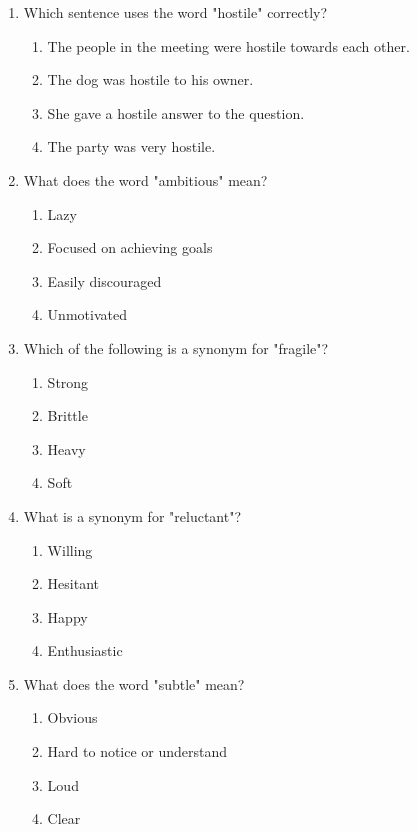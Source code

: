 \documentclass[12pt]{article}
\begin{document}
\begin{enumerate}
\item Which sentence uses the word "hostile" correctly?
\begin{enumerate}[label=\Alph*.]
    \item The people in the meeting were hostile towards each other.
    \item The dog was hostile to his owner.
    \item She gave a hostile answer to the question.
    \item The party was very hostile.
\end{enumerate}

\vspace{0.5cm}

\item What does the word "ambitious" mean?
\begin{enumerate}[label=\Alph*.]
    \item Lazy
    \item Focused on achieving goals
    \item Easily discouraged
    \item Unmotivated
\end{enumerate}

\vspace{0.5cm}

\item Which of the following is a synonym for "fragile"?
\begin{enumerate}[label=\Alph*.]
    \item Strong
    \item Brittle
    \item Heavy
    \item Soft
\end{enumerate}

\vspace{0.5cm}

\item What is a synonym for "reluctant"?
\begin{enumerate}[label=\Alph*.]
    \item Willing
    \item Hesitant
    \item Happy
    \item Enthusiastic
\end{enumerate}

\vspace{0.5cm}

\item What does the word "subtle" mean?
\begin{enumerate}[label=\Alph*.]
    \item Obvious
    \item Hard to notice or understand
    \item Loud
    \item Clear
\end{enumerate}

\end{enumerate}
\end{document}
